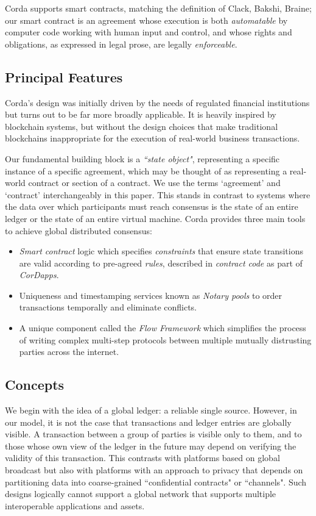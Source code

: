 \documentclass{article}
\begin{document}
Corda supports smart contracts, matching the definition of Clack, Bakshi, Braine\cite{SCT}; our smart contract is an agreement whose execution is both \textit{automatable} by computer code working with human input and control, and whose rights and obligations, as expressed in legal prose, are legally \textit{enforceable}.

\subsection{Principal Features}
Corda's design was initially driven by the needs of regulated financial institutions but turns out to be far more broadly applicable. It is heavily inspired by blockchain systems, but without the design choices that make traditional blockchains inappropriate for the execution of real-world business transactions.

Our fundamental building block is a \textit{``state object"}, representing a specific instance of a specific agreement, which may be thought of as representing a real-world contract or section of a contract. We use the terms `agreement' and `contract' interchangeably in this paper. This stands in contrast to systems where the data over which participants must reach consensus is the state of an entire ledger or the state of an entire virtual machine. Corda provides three main tools to achieve global distributed consensus:
\begin{itemize}
    \item \textit{Smart contract} logic which specifies \textit{constraints} that ensure state transitions are valid according to pre-agreed \textit{rules}, described in \textit{contract code} as part of \textit{CorDapps}.
    \item Uniqueness and timestamping services known as \textit{Notary pools} to order transactions temporally and eliminate conflicts.
    \item A unique component called the \textit{Flow Framework} which simplifies the process of writing complex multi-step protocols between multiple mutually distrusting parties across the internet.
\end{itemize}

\subsection{Concepts}
We begin with the idea of a global ledger: a reliable single source. However, in our model, it is not the case that transactions and ledger entries are globally visible. A transaction between a group of parties is visible only to them, and to those whose own view of the ledger in the future may depend on verifying the validity of this transaction. This contrasts with platforms based on global broadcast but also with platforms with an approach to privacy that depends on partitioning data into coarse-grained ``confidential contracts" or ``channels". Such designs logically cannot support a global network that supports multiple interoperable applications and assets.
\end{document}
